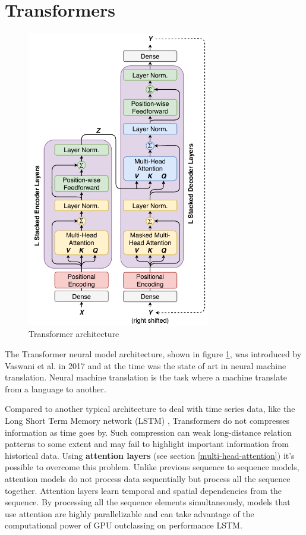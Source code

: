 \section{Transformers}
\label{transformers_section}

\begin{figure}[h]
    \centering
    \includegraphics[width=8cm]{cap3/trasformers.png}
    \caption{Transformer architecture \cite{vaswani2017attention}}
    \label{fig:transformer_architecture}
\end{figure}



The Transformer neural model architecture, shown in figure \ref{fig:transformer_architecture}, was introduced by Vaswani et al. \cite{vaswani2017attention} in 2017 and at the time was the state of art in neural machine translation. Neural machine translation is the task where a machine translate from a language to another.

Compared to another typical architecture to deal with time series data, like the Long Short Term Memory network (LSTM) \cite{longshortterm},
Transformers do not compresses information as time goes by.
Such compression can weak long-distance relation patterns to some extent and may fail to highlight important information from historical data. Using \textbf{attention layers} (see section \ref{multi-head-attention}) it's possible to overcome this problem. Unlike previous sequence to sequence models, attention models do not process data sequentially but process all the sequence together. Attention layers learn temporal and spatial dependencies from the sequence. By processing all the sequence elements simultaneously, models that use attention are highly parallelizable and can take advantage of the computational power of GPU outclassing on performance LSTM. 

